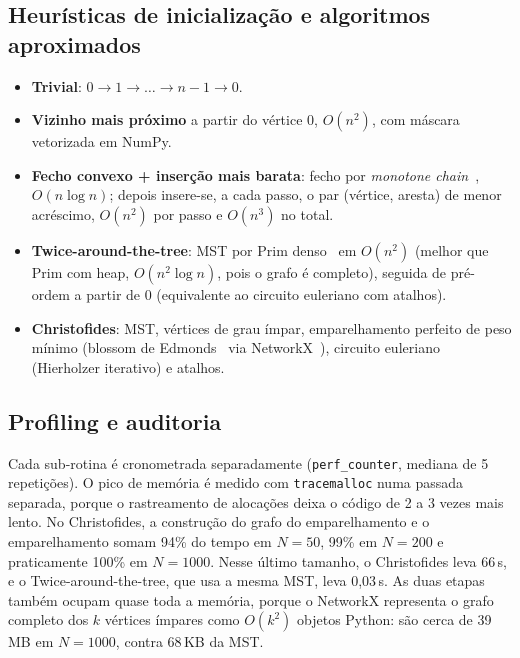 \documentclass[12pt]{article}
\begin{document}
\subsection{Heurísticas de inicialização e algoritmos aproximados}

\begin{itemize}
  \item \textbf{Trivial}: $0 \to 1 \to \dots \to n-1 \to 0$.
  \item \textbf{Vizinho mais próximo} a partir do vértice $0$, $O(n^2)$, com máscara
        vetorizada em NumPy.
  \item \textbf{Fecho convexo + inserção mais barata}: fecho por \textit{monotone
        chain}~\cite{andrew1979}, $O(n \log n)$; depois insere-se, a cada passo, o par
        (vértice, aresta) de menor acréscimo, $O(n^2)$ por passo e $O(n^3)$ no total.
  \item \textbf{Twice-around-the-tree}: MST por Prim denso~\cite{prim1957} em $O(n^2)$
        (melhor que Prim com heap, $O(n^2 \log n)$, pois o grafo é completo), seguida de
        pré-ordem a partir de $0$ (equivalente ao circuito euleriano com atalhos).
  \item \textbf{Christofides}: MST, vértices de grau ímpar, emparelhamento perfeito de
        peso mínimo (blossom de Edmonds~\cite{edmonds1965} via
        NetworkX~\cite{networkx2008}), circuito euleriano (Hierholzer iterativo) e atalhos.
\end{itemize}

\subsection{Profiling e auditoria}

Cada sub-rotina é cronometrada separadamente (\texttt{perf\_counter}, mediana de 5
repetições). O pico de memória é medido com \texttt{tracemalloc} numa passada
separada, porque o rastreamento de alocações deixa o código de 2 a 3 vezes mais lento.
No Christofides, a construção do grafo do emparelhamento e o emparelhamento somam 94\%
do tempo em $N=50$, 99\% em $N=200$ e praticamente 100\% em $N=1000$. Nesse último
tamanho, o Christofides leva 66\,s, e o Twice-around-the-tree, que usa a mesma MST,
leva 0,03\,s. As duas etapas também ocupam quase toda a memória, porque o NetworkX
representa o grafo completo dos $k$ vértices ímpares como $O(k^2)$ objetos Python: são
cerca de 39\,MB em $N=1000$, contra 68\,KB da MST.
\end{document}
